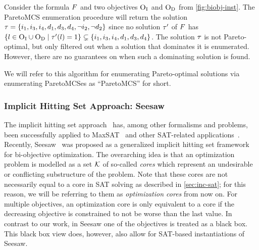 \begin{example}\label{ex:MCS}
  Consider the formula $F$ and two objectives $\textsc{O}_{\text{I}}$ and $\textsc{O}_{\text{D}}$ from \cref{fig:biobj-inst}.
  The ParetoMCS enumeration procedure will return the solution $\tau = \{i_1,\allowbreak i_3,\allowbreak i_4,\allowbreak d_1,\allowbreak d_3,\allowbreak d_4,\allowbreak \lnot i_2,\allowbreak \lnot d_2\}$ since no solution $\tau'$ of $F$ has $\{l \in \textsc{O}_{\text{I}} \cup \textsc{O}_{\text{D}} \mid  \tau'(l) = 1\} \subsetneq \{i_1, i_3, i_4, d_1, d_3, d_4\}$.
  The solution $\tau$ is not Pareto-optimal, but only filtered out when a solution that dominates it is enumerated.
  However, there are no guarantees on when such a dominating solution is found. 
\end{example}

We will refer to this algorithm for enumerating Pareto-optimal solutions via enumerating ParetoMCSes as ``ParetoMCS'' for short.

\subsubsection{Implicit Hitting Set Approach: Seesaw\label{sec:seesaw}}

The implicit hitting set approach~\autocites{DBLP:conf/soda/ChandrasekaranKMV11,DBLP:journals/ior/Moreno-CentenoK13,DBLP:journals/amai/ParkerR96,DBLP:journals/ijmms/ReggiaNW83,DBLP:journals/ai/Reiter87} has, among other formalisms and problems, been successfully applied to MaxSAT~\autocite{DBLP:conf/cp/DaviesB13,DBLP:conf/sat/DaviesB13,DBLP:conf/cp/DaviesB11,DBLP:conf/sat/BergBP20} and other SAT-related applications~\autocite{DBLP:conf/ecai/IgnatievMM16,DBLP:conf/cp/IgnatievPLM15,DBLP:conf/kr/SaikkoWJ16}.
Recently, Seesaw~\autocite{DBLP:conf/cp/JanotaMSM21} was proposed as a generalized implicit hitting set framework for bi-objective optimization.
The overarching idea is that an optimization problem is modelled as a set $\mathcal{K}$ of so-called \emph{cores} which represent an undesirable or conflicting substructure of the problem.
Note that these cores are not necessarily equal to a core in SAT solving as described in \cref{sec:inc-sat};
for this reason, we will be referring to them as \emph{optimization cores} from now on.
For multiple objectives, an optimization core is only equivalent to a core if the decreasing objective is constrained to not be worse than the last value.
In contrast to our work, in Seesaw one of the objectives is treated as a black box.
This black box view does, however, also allow for SAT-based instantiations of Seesaw.

